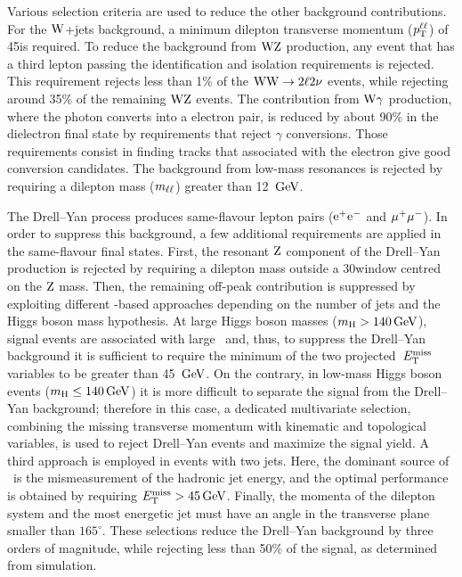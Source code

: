 \documentclass[12pt,twoside,a4paper,cmspaper,final,collab]{cms-tdr}
\begin{document}
Various selection criteria are used to reduce the other background contributions. For the $\mathrm{W}$+jets background,
a minimum dilepton transverse momentum ($p_{\mathrm{T}}^{\ell\ell}$) of 45\GeV is required.
To reduce the background from $\mathrm{W}\mathrm{Z}$ production, any event
that has a third lepton passing the identification and isolation requirements is rejected.
This requirement rejects less than 1\% of the $\mathrm{W}\mathrm{W} \to 2\ell2\nu$ events, while
rejecting around 35\% of the remaining $\mathrm{W}\mathrm{Z}$ events.
The contribution from $\mathrm{W}\gamma$ production,
where the photon converts into a electron pair, is reduced by about 90\%
in the dielectron final state by  requirements that reject $\gamma$ conversions.
Those requirements consist in finding tracks that associated with the
electron give good conversion candidates.
The background from low-mass resonances is rejected by requiring a dilepton mass ($m_{\ell\ell}$) greater
than 12 $\,\text{Ge\hspace{-.08em}V}$.

The Drell--Yan process produces same-flavour lepton pairs ($\mathrm{e}^+\mathrm{e}^-$ and ${\mu^+}{\mu^-}$). In order
to suppress this background, a few additional requirements are applied in the same-flavour final states.
First, the resonant $\mathrm{Z}$ component of the Drell--Yan production is rejected by requiring
a dilepton mass outside a 30\GeV window centred on the $\mathrm{Z}$ mass.
Then, the remaining off-peak contribution is suppressed by exploiting different \MET-based approaches depending
on the number of jets and the Higgs boson mass hypothesis.
At large Higgs boson masses ($m_{\mathrm{H}} > 140\,\text{Ge\hspace{-.08em}V}$), signal events are associated with large \MET\ and, thus,
to suppress the Drell--Yan background it is sufficient to require the minimum of the
two projected~$E_{\mathrm{T}}^{\text{miss}}$ variables to be greater than 45 $\,\text{Ge\hspace{-.08em}V}$.
On the contrary, in low-mass Higgs boson events ($m_{\mathrm{H}} \leq 140\,\text{Ge\hspace{-.08em}V}$) it is more difficult to separate the signal from the Drell--Yan background;
therefore in this case, a dedicated multivariate selection, combining the missing transverse momentum with kinematic and topological variables, is used to
reject Drell--Yan events and maximize the signal yield.
A third approach is employed in events with two jets. Here, the dominant source of \MET\ is the mismeasurement of the hadronic jet energy,
and the optimal performance is obtained by requiring $E_{\mathrm{T}}^{\text{miss}} > 45\,\text{Ge\hspace{-.08em}V}$.
Finally, the momenta of the dilepton system and the most energetic jet must have an angle
in the transverse plane smaller than $165^\circ$. These selections reduce the Drell--Yan
background by three orders of magnitude, while rejecting less than 50\% of the signal, as determined from simulation.
\end{document}
